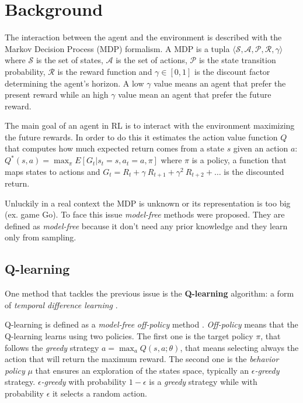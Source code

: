 \section{Background}

The interaction between the agent and the environment is described  with the
Markov Decision Process (MDP) formalism. A MDP is a tupla $\langle \mathcal{S}, 
\mathcal{A}, \mathcal{P}, \mathcal{R}, \gamma \rangle$ where $\mathcal{S}$ is
the set of states, $\mathcal{A}$ is the set of actions, $\mathcal{P}$ is the 
state transition probability, $\mathcal{R}$ is the reward function and 
$\gamma \in [0,1]$ is the discount factor determining the agent's horizon. A low $\gamma$ value means an agent that prefer the present reward while an high $\gamma$ value mean an agent that prefer the future reward.

The main goal of an agent in RL is to interact with the environment maximizing the future rewards. In order to do this it estimates the action value function $Q$ that computes how much expected return comes from a state $s$ given an action $a$: $Q^*(s, a) = \max_\pi E[ G_t | s_t = s, a_t = a, \pi]$ where $\pi$ is a policy, a function that maps states to actions and $G_t = R_t + \gamma~R_{t+1} + \gamma^2~R_{t+2} + \dots$ is the discounted return.


Unluckily in a real context the MDP is unknown or its representation is too big
(ex. game Go). To face this issue \textit{model-free} methods were proposed. They are defined as \textit{model-free} because it don't need any prior knowledge and they learn only from sampling.

\subsection{Q-learning}

One method that tackles the previous issue is the \textbf{Q-learning} algorithm: a form of \textit{temporal difference learning} \cite{Sutton:1998:IRL:551283}.

Q-learning is defined as a \textit{model-free} \textit{off-policy} method \cite{Watkins1992}. \textit{Off-policy} means that the Q-learning learns using two policies. The first one is the target policy $\pi$, that follows the \textit{greedy} strategy $a = \max_a Q(s, a; \theta)$, that means selecting always the action that will return the maximum reward.
The second one is the \textit{behavior policy} $\mu$ that ensures an exploration of the states space, typically an \textit{$\epsilon$-greedy} strategy. \textit{$\epsilon$-greedy} with probability $1 - \epsilon$ is a \textit{greedy} strategy while with probability $\epsilon$ it selects a random action.

